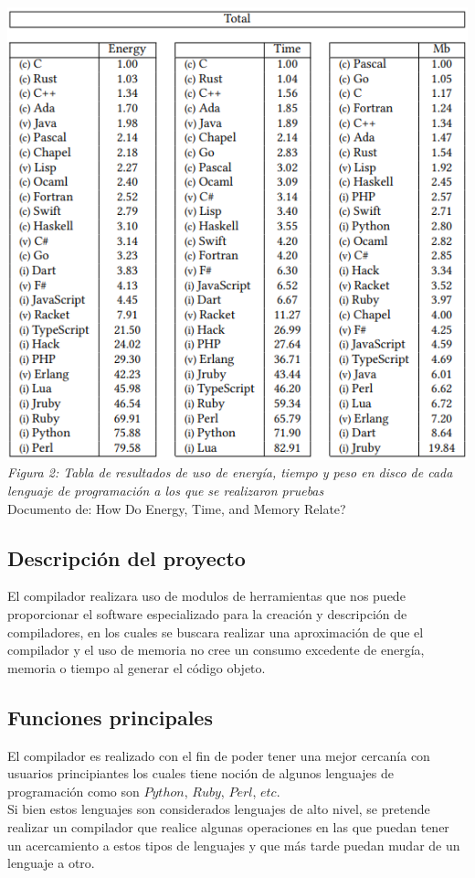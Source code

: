 \documentclass[10pt,executivepaper]{article}
\begin{document}
\begin{center}
  \includegraphics[scale=0.7]{imgs/tabla2.png}
  \\\textit{Figura 2: Tabla de resultados de uso de energía, tiempo y peso en disco de cada lenguaje de programación a los que se realizaron pruebas }\\{\scriptsize Documento de: How Do Energy, Time, and Memory Relate?}
\end{center}
\subsection{Descripción del proyecto}
El compilador realizara uso de modulos de herramientas que nos puede proporcionar el software especializado para la creación y descripción de compiladores, en los cuales se buscara realizar una aproximación de que el compilador y el uso de memoria no cree un consumo excedente de energía, memoria o tiempo al generar el código objeto.
\subsection{Funciones principales}
El compilador es realizado con el fin de poder tener una mejor cercanía con usuarios principiantes los cuales tiene noción de algunos lenguajes de programación como son $Python$, $Ruby$, $Perl$, $etc$.\\Si bien estos lenguajes son considerados lenguajes de alto nivel, se pretende realizar un compilador que realice algunas  operaciones en las que puedan tener un acercamiento a estos tipos de lenguajes y que más tarde puedan mudar de un lenguaje a otro.
\end{document}
